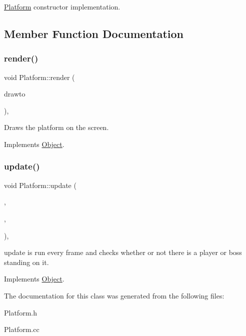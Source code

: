 \hyperlink{classPlatform}{Platform} constructor implementation. 

\subsection{Member Function Documentation}
\mbox{\label{classPlatform_a2b9b802b95f49d2862ed33aac05dcd5c}} 
\subsubsection{\texorpdfstring{render()}{render()}}
{\footnotesize\ttfamily void Platform\+::render (\begin{DoxyParamCaption}\item[{sf\+::\+Render\+Window \&}]{drawto }\end{DoxyParamCaption})\hspace{0.3cm}{\ttfamily [override]}, {\ttfamily [virtual]}}

Draws the platform on the screen. 

Implements \hyperlink{classObject}{Object}.

\mbox{\label{classPlatform_af4288367c167c4cdecf93070b7a5d464}} 
\subsubsection{\texorpdfstring{update()}{update()}}
{\footnotesize\ttfamily void Platform\+::update (\begin{DoxyParamCaption}\item[{std\+::vector$<$ \hyperlink{classObject}{Object} $\ast$$>$ \&}]{,  }\item[{\hyperlink{classObject}{Object} $\ast$}]{,  }\item[{\hyperlink{classObject}{Object} $\ast$}]{ }\end{DoxyParamCaption})\hspace{0.3cm}{\ttfamily [override]}, {\ttfamily [virtual]}}

update is run every frame and checks whether or not there is a player or boss standing on it. 

Implements \hyperlink{classObject}{Object}.



The documentation for this class was generated from the following files\+:\begin{DoxyCompactItemize}
\item 
Platform.\+h\item 
Platform.\+cc\end{DoxyCompactItemize}
